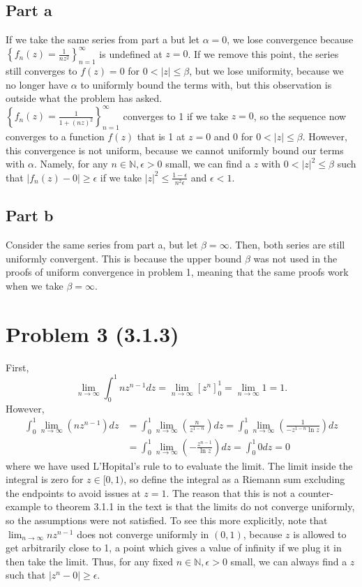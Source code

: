 \documentclass{article}
\begin{document}
\subsection{Part a}
If we take the same series from part a but let $\alpha=0$, we lose convergence because $\left\{f_n(z)=\frac{1}{nz^2}\right\}_{n=1}^{\infty}$ is undefined at $z=0$. If we remove this point, the series still converges to $f(z)=0$ for $0 < |z| \leq \beta$, but we lose uniformity, because  we no longer have $\alpha$ to uniformly bound the terms with, but this observation is outside what the problem has asked. \\
 $\left\{f_n(z)=\frac{1}{1+(nz)^2}\right\}_{n=1}^{\infty}$ converges to 1 if we take $z=0$, so the sequence now converges to a function $f(z)$ that is 1 at $z=0$ and 0 for $0 < |z| \leq \beta$. However, this convergence is not uniform, because we cannot uniformly bound our terms with $\alpha$. Namely, for any $n\in\mathbb{N},\epsilon>0$ small, we can find a $z$ with $0<|z|^2\leq\beta$ such that $|f_n(z)-0|\geq\epsilon$ if we take $|z|^2\leq\frac{1-\epsilon}{n^2\epsilon}$ and $\epsilon<1$.

\subsection{Part b}
Consider the same series from part a, but let $\beta=\infty$. Then, both series are still uniformly convergent. This is because the upper bound $\beta$ was not used in the proofs of uniform convergence in problem 1, meaning that the same proofs work when we take $\beta=\infty$.

\section{Problem 3 (3.1.3)}
First,
\[
\lim_{n \to \infty} \int_0^1 n z^{n-1} dz=\lim_{n \to \infty}\left[z^n\right]_0^1=\lim_{n \to \infty} 1=1.
\]
However,
\begin{align*}
\int_0^1\lim_{n \to \infty} \left(n z^{n-1}\right)dz&=\int_0^1\lim_{n \to \infty} \left(\frac{n}{z^{1-n}}\right)dz=\int_0^1\lim_{n \to \infty} \left(\frac{1}{-z^{1-n}\ln{z}}\right)dz\\&=\int_0^1\lim_{n \to \infty} \left(-\frac{z^{n-1}}{\ln{z}}\right)dz=\int_0^1 0dz=0
\end{align*}
where we have used L'Hopital's rule to to evaluate the limit. The limit inside the integral is zero for $z\in[0,1)$, so define the integral as a Riemann sum excluding the endpoints to avoid issues at $z=1$.
The reason that this is not a counter-example to theorem 3.1.1 in the text is that the limits do not converge uniformly, so the assumptions were not satisfied. To see this more explicitly, note that $\lim_{n \to \infty} nz^{n-1}$ does not converge uniformly in $(0,1)$, because $z$ is allowed to get arbitrarily close to 1, a point which gives a value of infinity if we plug it in then take the limit. Thus, for any fixed $n\in\mathbb{N},\epsilon>0$ small, we can always find a $z$ such that $|z^n-0|\geq\epsilon$.
\end{document}
